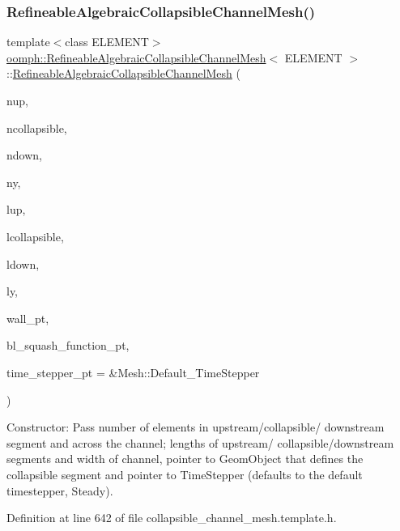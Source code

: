 \subsubsection{\texorpdfstring{Refineable\+Algebraic\+Collapsible\+Channel\+Mesh()}{RefineableAlgebraicCollapsibleChannelMesh()}\hspace{0.1cm}{\footnotesize\ttfamily [2/2]}}
{\footnotesize\ttfamily template$<$class E\+L\+E\+M\+E\+NT$>$ \\
\hyperlink{classoomph_1_1RefineableAlgebraicCollapsibleChannelMesh}{oomph\+::\+Refineable\+Algebraic\+Collapsible\+Channel\+Mesh}$<$ E\+L\+E\+M\+E\+NT $>$\+::\hyperlink{classoomph_1_1RefineableAlgebraicCollapsibleChannelMesh}{Refineable\+Algebraic\+Collapsible\+Channel\+Mesh} (\begin{DoxyParamCaption}\item[{const unsigned \&}]{nup,  }\item[{const unsigned \&}]{ncollapsible,  }\item[{const unsigned \&}]{ndown,  }\item[{const unsigned \&}]{ny,  }\item[{const double \&}]{lup,  }\item[{const double \&}]{lcollapsible,  }\item[{const double \&}]{ldown,  }\item[{const double \&}]{ly,  }\item[{Geom\+Object $\ast$}]{wall\+\_\+pt,  }\item[{\hyperlink{classoomph_1_1CollapsibleChannelDomain_a2bf1d7943bfac134a5c27a54c7e1faed}{Collapsible\+Channel\+Domain\+::\+B\+L\+Squash\+Fct\+Pt}}]{bl\+\_\+squash\+\_\+function\+\_\+pt,  }\item[{Time\+Stepper $\ast$}]{time\+\_\+stepper\+\_\+pt = {\ttfamily \&Mesh\+:\+:Default\+\_\+TimeStepper} }\end{DoxyParamCaption})\hspace{0.3cm}{\ttfamily [inline]}}



Constructor\+: Pass number of elements in upstream/collapsible/ downstream segment and across the channel; lengths of upstream/ collapsible/downstream segments and width of channel, pointer to Geom\+Object that defines the collapsible segment and pointer to Time\+Stepper (defaults to the default timestepper, Steady). 



Definition at line 642 of file collapsible\+\_\+channel\+\_\+mesh.\+template.\+h.



